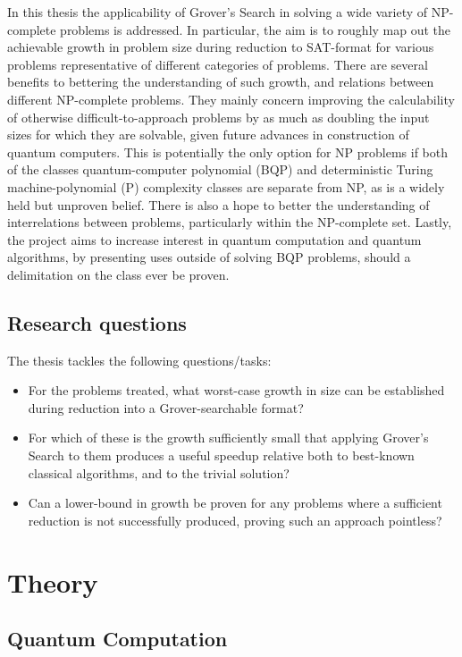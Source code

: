 \documentclass[msc,lith,english]{liuthesis}
\begin{document}
In this thesis the applicability of Grover's Search in solving a wide variety of NP-complete problems is addressed. In particular, the aim is to roughly map out the achievable growth in problem size during reduction to SAT-format for various problems representative of different categories of problems. There are several benefits to bettering the understanding of such growth, and relations between different NP-complete problems. They mainly concern improving the calculability of otherwise difficult-to-approach problems by as much as doubling the input sizes for which they are solvable, given future advances in construction of quantum computers. This is potentially the only option for NP problems if both of the classes quantum-computer polynomial (BQP) and deterministic Turing machine-polynomial (P) complexity classes are separate from NP, as is a widely held but unproven belief. There is also a hope to better the understanding of interrelations between problems, particularly within the NP-complete set. Lastly, the project aims to increase interest in quantum computation and quantum algorithms, by presenting uses outside of solving BQP problems, should a delimitation on the class ever be proven.

\section{Research questions}
The thesis tackles the following questions/tasks:
\begin{itemize}
    \item For the problems treated, what worst-case growth in size can be established during reduction into a Grover-searchable format?
    \item For which of these is the growth sufficiently small that applying Grover's Search to them produces a useful speedup relative both to best-known classical algorithms, and to the trivial solution?
    \item Can a lower-bound in growth be proven for any problems where a sufficient reduction is not successfully produced, proving such an approach pointless?
\end{itemize}

\chapter{Theory}

\section{Quantum Computation}
\end{document}

